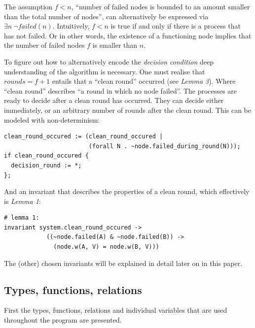\documentclass[fleqn]{article}
\begin{document}
The assumption $f<n$, ``number of failed nodes is bounded to an amount smaller than the total number of nodes'', can alternatively be expressed via $\exists n\ \neg failed(n)$. Intuitively, $f<n$ is true if and only if there is a process that has not failed. Or in other words, the existence of a functioning node implies that the number of failed nodes $f$ is smaller than $n$.

To figure out how to alternatively encode the \textit{decision condition} deep understanding of the algorithm is necessary. One must realise that $rounds = f+1$ entails that a ``clean round'' occurred (see \textit{Lemma 3}). Where ``clean round'' describes ``a round in which no node failed''. The processes are ready to decide after a clean round has occurred. They can decide either immediately, or an arbitrary number of rounds after the clean round. This can be modeled with non-determinism:

\begin{mdframed}[nobreak=true, backgroundcolor=light-gray, roundcorner=10pt,leftmargin=1, rightmargin=1, innerleftmargin=15, innertopmargin=15,innerbottommargin=15, outerlinewidth=1, linecolor=light-gray]
\begin{lstlisting}
clean_round_occured := (clean_round_occured |
                        (forall N . ~node.failed_during_round(N)));
if clean_round_occured {
  decision_round := *;
};
\end{lstlisting}
\end{mdframed}

\noindent And an invariant that describes the properties of a clean round, which effectively is \textit{Lemma 1}:

\begin{mdframed}[nobreak=true, backgroundcolor=light-gray, roundcorner=10pt,leftmargin=1, rightmargin=1, innerleftmargin=15, innertopmargin=15,innerbottommargin=15, outerlinewidth=1, linecolor=light-gray]
\begin{lstlisting}
# lemma 1:
invariant system.clean_round_occured ->
            ((~node.failed(A) & ~node.failed(B)) ->
              (node.w(A, V) = node.w(B, V)))
\end{lstlisting}
\end{mdframed}

\noindent The (other) chosen invariants will be explained in detail later on in this paper.

\subsection{Types, functions, relations}
First the types, functions, relations and individual variables that are used throughout the program are presented.
\end{document}
